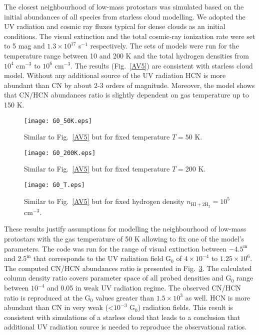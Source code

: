 \documentclass{aa}
\begin{document}
The closest neighbourhood of low-mass protostars was simulated based on the initial abundances of all species from starless cloud modelling. We adopted the UV radiation and cosmic ray fluxes typical for dense clouds as an initial conditions. The visual extinction and the total cosmic-ray ionization rate were set to 5 mag and $1.3\times 10^{17}$ s$^{-1}$ respectively. The sets of models were run for the temperature range between 10 and 200 K and the total hydrogen densities from $10^4$ cm$^{-3}$ to $10^6$ cm$^{-3}$. The results (Fig.~\ref{AV5}) are consistent with starless cloud model. Without any additional source of the UV radiation HCN is more abundant than CN by about 2-3 orders of magnitude. Moreover, the model shows that CN/HCN abundances ratio is slightly dependent on gas temperature up to 150 K. 

\begin{figure}
\centering
\texttt{[image: G0\_50K.eps]}
\caption{Similar to Fig.~\ref{AV5} but for fixed temperature $T = 50$ K.}
\label{G0}
\end{figure}

\begin{figure}
\centering
\texttt{[image: G0\_200K.eps]}
\caption{Similar to Fig.~\ref{AV5} but for fixed temperature $T = 200$ K.}
\label{G0}
\end{figure}

\begin{figure}
\centering
\texttt{[image: G0\_T.eps]}
\caption{Similar to Fig.~\ref{AV5} but for fixed hydrogen density $n_\mathrm{HI+2 \dot H_2} = 10^5$ cm$^{-3}$.}
\label{G0}
\end{figure}

These results justify assumptions for modelling the neighbourhood of low-mass protostars with the gas temperature of 50 K allowing to fix one of the model’s parameters. The code was run for the range of visual extinction between $-4.5^{\mathrm{m}}$ and $2.5^{\mathrm{m}}$ that corresponds to the UV radiation field G$_0$ of $4\times 10^{-4}$ to $1.25\times 10^{6}$. The computed CN/HCN abundances ratio is presented in Fig.~\ref{G0}. The calculated column density ratio covers parameter space of all probed densities and G$_0$ range between $10^{-4}$ and 0.05 in weak UV radiation regime. The observed CN/HCN ratio is reproduced at the G$_0$ values greater than $1.5 \times 10^{3}$ as well. HCN is more abundant than CN in very weak (<$10^{-3}$ G$_0$) radiation fields. This result is consistent with simulations of a starless cloud that leads to a conclusion that additional UV radiation source is needed to reproduce the observational ratios. 
\end{document}
